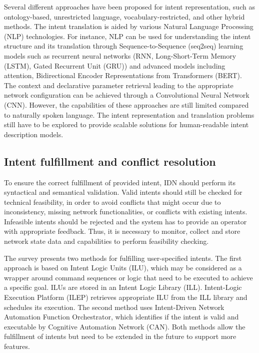 Several different approaches have been proposed for intent representation, such as ontology-based, unrestricted language, vocabulary-restricted, and other hybrid methods. The intent translation is aided by various Natural Language Processing (NLP) technologies. For instance, NLP  can be used for understanding the intent structure and its translation through Sequence-to-Sequence (seq2seq) learning models such as recurrent neural networks (RNN, Long-Short-Term Memory (LSTM), Gated Recurrent Unit (GRU)) and advanced models including attention, Bidirectional Encoder Representations from Transformers (BERT). The context and declarative parameter retrieval leading to the appropriate network configuration can be achieved through a Convolutional Neural Network (CNN). However, the capabilities of these approaches are still limited compared to naturally spoken language. The intent representation and translation problems still have to be explored to provide scalable solutions for human-readable intent description models. \cite[18]{Mehmood2021} 


\subsection{Intent fulfillment and conflict resolution}

To ensure the correct fulfillment of provided intent, IDN should perform its syntactical and semantical validation. Valid intents should still be checked for technical feasibility, in order to avoid conflicts that might occur due to inconsistency, missing network functionalities, or conflicts with existing intents. Infeasible intents should be rejected and the system has to provide an operator with appropriate feedback. Thus, it is necessary to monitor, collect and store network state data and capabilities to perform feasibility checking.

The survey \cite{Mwanje2021} presents two methods for fulfilling user-specified intents. The first approach is based on Intent Logic Units (ILU), which may be considered as a wrapper around command sequences or logic that need to be executed to achieve a specific goal. ILUs are stored in an Intent Logic Library (ILL). Intent-Logic Execution Platform (ILEP) retrieves appropriate ILU from the ILL library and schedules its execution. The second method uses Intent-Driven Network Automation Function Orchestrator, which identifies if the intent is valid and executable by Cognitive Automation Network (CAN). Both methods allow the fulfillment of intents but need to be extended in the future to support more features.

